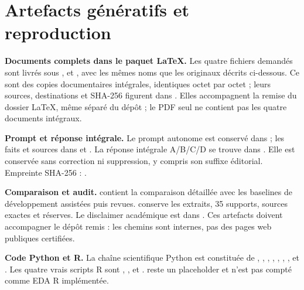 \section{Artefacts génératifs et reproduction}
\label{app:D}

\textbf{Documents complets dans le paquet LaTeX.} Les quatre fichiers demandés sont livrés sous ,  et , avec les mêmes noms que les originaux décrits ci-dessous. Ce sont des copies documentaires intégrales, identiques octet par octet ; leurs sources, destinations et SHA-256 figurent dans . Elles accompagnent la remise du dossier LaTeX, même séparé du dépôt ; le PDF seul ne contient pas les quatre documents intégraux.

\textbf{Prompt et réponse intégrale.} Le prompt autonome est conservé dans  ; les faits et sources dans  et . La réponse intégrale A/B/C/D se trouve dans . Elle est conservée sans correction ni suppression, y compris son suffixe éditorial. Empreinte SHA-256 : .



\textbf{Comparaison et audit.}  contient la comparaison détaillée avec les baselines de développement assistées puis revues.  conserve les extraits, 35 supports, sources exactes et réserves. Le disclaimer académique est dans . Ces artefacts doivent accompagner le dépôt remis : les chemins sont internes, pas des pages web publiques certifiées.



\textbf{Code Python et R.} La chaîne scientifique Python est constituée de , , , , , , ,  et . Les quatre vrais scripts R sont , ,  et .  reste un placeholder et n’est pas compté comme EDA R implémentée.



